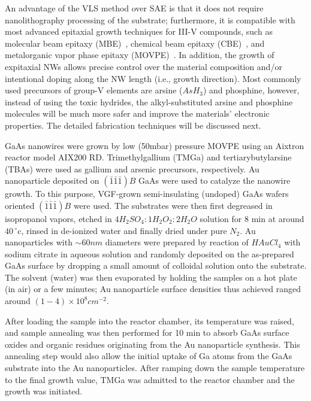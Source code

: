 An advantage of the VLS method over SAE is that it does not require
nanolithography processing of the substrate; furthermore, it is compatible with
most advanced epitaxial growth techniques for III-V compounds, such as
molecular beam epitaxy (MBE)~\cite{Zhou:2009cg,colombo2008ga}, chemical beam
epitaxy (CBE)~\cite{ercolani2009inas}, and metalorganic vapor phase epitaxy
(MOVPE)~\cite{Noborisaka:2005hh,paiano2006size}. In addition, the growth of
expitaxial NWs allows precise control over the material composition and/or
intentional doping along the NW length (i.e., growth direction). Most commonly
used precursors of group-V elements are arsine ($AsH_3$) and phosphine,
however, instead of using the toxic hydrides, the alkyl-substituted arsine and
phosphine molecules will be much more safer and improve the materials'
electronic properties. The detailed fabrication techniques will be discussed
next.

GaAs nanowires were grown by low (50mbar) pressure MOVPE using an Aixtron
reactor model AIX200 RD. Trimethylgallium (TMGa) and tertiarybutylarsine (TBAs)
were used as gallium and arsenic precursors, respectively. Au nanoparticle
deposited on $(\bar{1}\bar{1}\bar{1})B$ GaAs were used to catalyze the nanowire
growth. To this purpose, VGF-grown semi-insulating (undoped) GaAs wafers
oriented $(\bar{1}\bar{1}\bar{1})B$ were used. The substrates were then first
degreased in isopropanol vapors, etched in $4H_2SO_4:1H_2O_2:2H_2O$ solution
for 8 min at around $40\,^{\circ}\mathrm{c}$, rinsed in de-ionized water and
finally dried under pure $N_2$. Au nanoparticles with $\sim 60 nm$ diameters
were prepared by reaction of $HAuCl_4$ with sodium citrate in aqueous solution
and randomly deposited on the as-prepared GaAs surface by dropping a small
amount of colloidal solution onto the substrate. The solvent (water) was then
evaporated by holding the samples on a hot plate (in air) or a few minutes; Au
nanoparticle surface densities thus achieved ranged around
$(1-4)\times{10}^8{cm}^{-2}$.

After loading the sample into the reactor chamber, its temperature was raised,
and sample annealing was then performed for 10 min to absorb GaAs surface
oxides and organic residues originating from the Au nanoparticle synthesis.
This annealing step would also allow the initial uptake of Ga atoms from the
GaAs substrate into the Au nanoparticles. After ramping down the sample
temperature to the final growth value, TMGa was admitted to the reactor chamber
and the growth was initiated.

